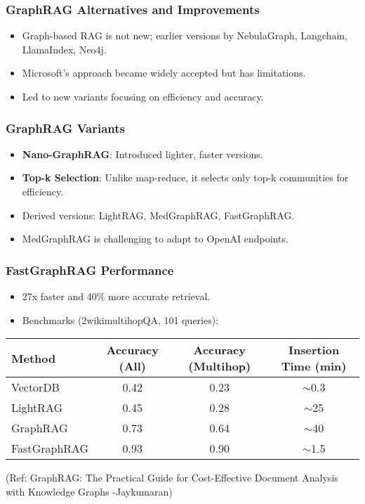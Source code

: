 \begin{frame}[fragile]\frametitle{GraphRAG Alternatives and Improvements}
    \begin{itemize}
        \item Graph-based RAG is not new; earlier versions by NebulaGraph, Langchain, LlamaIndex, Neo4j.
        \item Microsoft's approach became widely accepted but has limitations.
        \item Led to new variants focusing on efficiency and accuracy.
    \end{itemize}
\end{frame}

\begin{frame}[fragile]\frametitle{GraphRAG Variants}
    \begin{itemize}
        \item \textbf{Nano-GraphRAG}: Introduced lighter, faster versions.
        \item \textbf{Top-k Selection}: Unlike map-reduce, it selects only top-k communities for efficiency.
        \item Derived versions: LightRAG, MedGraphRAG, FastGraphRAG.
        \item MedGraphRAG is challenging to adapt to OpenAI endpoints.
    \end{itemize}
\end{frame}

\begin{frame}[fragile]\frametitle{FastGraphRAG Performance}
    \begin{itemize}
        \item 27x faster and 40\% more accurate retrieval.
        \item Benchmarks (2wikimultihopQA, 101 queries):
    \end{itemize}

	
    \begin{tabular}{lccc}
        \hline
        Method & Accuracy (All) & Accuracy (Multihop) & Insertion Time (min) \\
        \hline
        VectorDB & 0.42 & 0.23 & $\sim$0.3 \\
        LightRAG & 0.45 & 0.28 & $\sim$25 \\
        GraphRAG & 0.73 & 0.64 & $\sim$40 \\
        FastGraphRAG & 0.93 & 0.90 & $\sim$1.5 \\
        \hline
    \end{tabular}	
	
	{\tiny (Ref: GraphRAG: The Practical Guide for Cost-Effective Document Analysis with Knowledge Graphs -Jaykumaran)}	
\end{frame}

